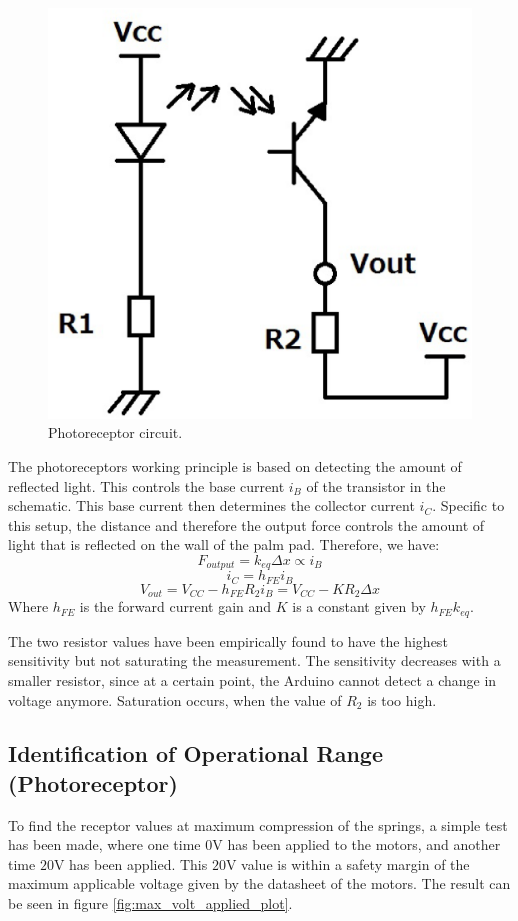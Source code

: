 	\begin{figure}[h!]
		\centering
		\includegraphics[width=0.2\linewidth]{Figs/tpr105_circuit}
		\caption{Photoreceptor circuit.}
		\label{fig:tpr105_circuit}
	\end{figure}
	The photoreceptors working principle is based on detecting the amount of reflected light. This controls the base current $i_B$ of the transistor in the schematic. This base current then determines the collector current $i_C$. Specific to this setup, the distance and therefore the output force controls the amount of light that is reflected on the wall of the palm pad. Therefore, we have:
	\begin{equation}
	F_{output} = k_{eq} \Delta x \propto i_B
	\end{equation}
	\begin{equation}
	i_C = h_{FE} i_B
	\end{equation}
	\begin{equation}
	V_{out} = V_{CC} - h_{FE} R_2 i_B = V_{CC} - K R_2 \Delta x
	\end{equation}
	Where $h_{FE}$ is the forward current gain and $K$ is a constant given by $h_{FE} k_{eq}$.
	
	The two resistor values have been empirically found to have the highest sensitivity but not saturating the measurement. The sensitivity decreases with a smaller resistor, since at a certain point, the Arduino cannot detect a change in voltage anymore. Saturation occurs, when the value of $R_2$ is too high.
	
	\subsection{Identification of Operational Range (Photoreceptor)}
	To find the receptor values at maximum compression of the springs, a simple test has been made, where one time $0$V has been applied to the motors, and another time $20$V has been applied. This $20$V value is within a safety margin of the maximum applicable voltage given by the datasheet of the motors. The result can be seen in figure \ref{fig:max_volt_applied_plot}.
	
